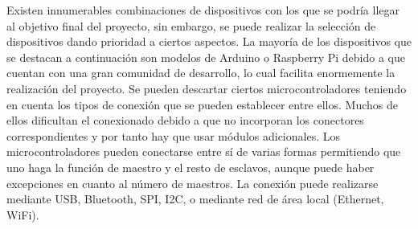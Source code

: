 Existen innumerables combinaciones de dispositivos con los que se podría llegar al objetivo final del proyecto, sin embargo, se puede realizar la selección de dispositivos dando prioridad a ciertos aspectos. La mayoría de los dispositivos que se destacan a continuación son modelos de Arduino o Raspberry Pi debido a que cuentan con una gran comunidad de desarrollo, lo cual facilita enormemente la realización del proyecto.
Se pueden descartar ciertos microcontroladores teniendo en cuenta los tipos de conexión que se pueden establecer entre ellos. Muchos de ellos dificultan el conexionado debido a que no incorporan los conectores correspondientes y por tanto hay que usar módulos adicionales.
Los microcontroladores pueden conectarse entre sí de varias formas permitiendo que uno haga la función de maestro y el resto de esclavos, aunque puede haber excepciones en cuanto al número de maestros. La conexión puede realizarse mediante USB, Bluetooth, SPI, I2C, o mediante red de área local (Ethernet, WiFi).
